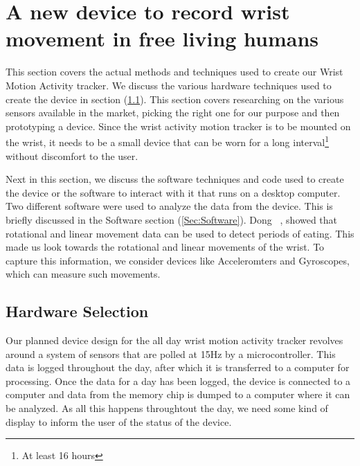 \chapter{A new device to record wrist movement in free living humans}
\label{Chap:Methods}
This section covers the actual methods and techniques used to create our Wrist 
Motion Activity tracker. We discuss the various hardware techniques used to 
create the device in section (\ref{Sec:Hardware}).
This section covers researching on the various sensors available in the market,
picking the right one for our purpose and then prototyping a device.
Since the wrist activity motion tracker is to be mounted on the wrist, it needs
to be a small device that can be worn for a long interval\footnote{At least
16 hours} without discomfort to the user.%

Next in this section, we discuss the software techniques and code
used to create the device or the software to interact with it that runs on a desktop computer.
Two different software were used to analyze the data from the device.
This is briefly discussed in the Software section (\ref{Sec:Software}).
Dong ~\cite{dong2013detecting}, showed that rotational and linear movement data can be used to detect
periods of eating. This made us look towards the rotational and linear movements of the wrist.
To capture this information, we consider devices like Acceleromters and Gyroscopes, which can measure such movements.

\section{Hardware Selection}
\label{Sec:Hardware}
Our planned device design for the all day wrist motion activity tracker revolves around a system of sensors that are polled at 15Hz by a microcontroller. This data is logged throughout the day, after which it is transferred to a computer for processing. Once the data for a day has been logged, the device is connected to a computer and data from the memory chip is dumped to a computer where it can be analyzed. As all this happens throughtout the day, we need some kind of display to inform the user of the status of the device.

